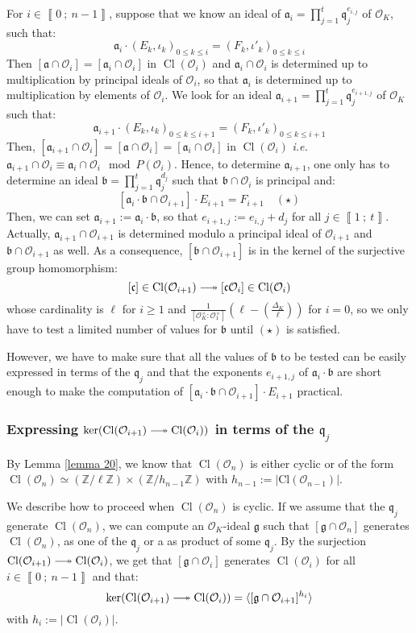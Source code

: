 \documentclass[a4paper,10pt]{report}
\theoremstyle{definition}
\theoremstyle{plain}
\theoremstyle{definition}
\newcommand{\ie}{\emph{i.e.}\ }
\newcommand{\Z}{\mathbb{Z}}
\newcommand{\mO}{\mathcal{O}}
\renewcommand{\i}[2]{\left\llbracket #1~;~#2\right\rrbracket}
\renewcommand{\(}{\left(}
\renewcommand{\)}{\right)}
\newcommand{\mf}[1]{\mathfrak{#1}}
\newcommand{\mfq}{\mathfrak{q}}
\DeclareMathOperator{\Cl}{Cl}
\begin{document}
For $i\in\i{0}{n-1}$, suppose that we know an ideal of $\mf{a}_i=\prod_{j=1}^t \mf{q}_j^{e_{i, j}}$ of $\mO_K$, such that: 
\[\mf{a}_i\cdot(E_k, \iota_k)_{0\leq k\leq i}=(F_k,\iota'_k)_{0\leq k\leq i}\]
Then $[\mf{a}\cap \mO_i]=[\mf{a}_i\cap\mO_i]$ in $\Cl(\mO_i)$ and $\mf{a}_i\cap \mO_i$ is determined up to multiplication by principal ideals of $\mO_i$, so that $\mf{a}_i$ is determined up to multiplication by elements of $\mO_i$.  We look for an ideal $\mf{a}_{i+1}=\prod_{j=1}^t \mf{q}_j^{e_{i+1, j}}$ of $\mO_K$ such that:
\[\mf{a}_{i+1}\cdot(E_k, \iota_k)_{0\leq k\leq i+1}=(F_k,\iota'_k)_{0\leq k\leq i+1}\]
Then, $[\mf{a}_{i+1}\cap\mO_{i}]=[\mf{a}\cap \mO_{i}]=[\mf{a}_i\cap\mO_{i}]$ in $\Cl(\mO_{i})$ \ie $\mf{a}_{i+1}\cap\mO_i\equiv \mf{a}_i\cap\mO_i \mod P(\mO_i)$. Hence, to determine $\mf{a}_{i+1}$, one only has to determine an ideal $\mf{b}=\prod_{j=1}^t\mf{q}_j^{d_j}$ such that $\mf{b}\cap\mO_i$ is principal and: 
\[[\mf{a}_i\cdot \mf{b}\cap\mO_{i+1}]\cdot E_{i+1}=F_{i+1} \quad (\star)\]
Then,  we can set $\mf{a}_{i+1}:=\mf{a}_i\cdot \mf{b}$, so that $e_{i+1,j}:=e_{i,j}+d_j$ for all $j\in\i{1}{t}$.  Actually, $\mf{a}_{i+1}\cap\mO_{i+1}$ is determined modulo a principal ideal of $\mO_{i+1}$ and $\mf{b}\cap\mO_{i+1}$ as well. As a consequence,  $[\mf{b}\cap\mO_{i+1}]$ is in the kernel of the surjective group homomorphism:
\[[\mf{c}]\in\Cl(\mO_{i+1})\relbar\joinrel\twoheadrightarrow [\mf{c}\mO_i]\in\Cl(\mO_{i})\]
whose cardinality is $\ell$ for $i\geq 1$ and $\frac{1}{[\mO_K^\times:\mO_1^\times]}\(\ell-\(\frac{\Delta_K}{\ell}\)\)$ for $i=0$, so we only have to test a limited number of values for $\mf{b}$ until $(\star)$ is satisfied.

However, we have to make sure that all the values of $\mf{b}$ to be tested can be easily expressed in terms of the $\mf{q}_j$ and that the exponents $e_{i+1,j}$ of $\mf{a}_i\cdot \mf{b}$ are short enough to make the computation of $[\mf{a}_i\cdot \mf{b}\cap\mO_{i+1}]\cdot E_{i+1}$ practical.  

\subsubsection{Expressing $\ker(\Cl(\mO_{i+1})\relbar\joinrel\twoheadrightarrow\Cl(\mO_{i}))$ in terms of the $\mfq_j$}

By Lemma \ref{lemma 20}, we know that $\Cl(\mO_n)$ is either cyclic or of the form $\Cl(\mO_n)\simeq(\Z/\ell\Z)\times(\Z/h_{n-1}\Z)$ with $h_{n-1}:=|\mbox{Cl}(\mO_{n-1})|$.

We describe how to proceed when $\Cl(\mO_n)$ is cyclic. If we assume that the $\mf{q}_j$ generate $\Cl(\mO_n)$, we can compute an $\mO_K$-ideal $\mf{g}$ such that $[\mf{g}\cap\mO_n]$ generates $\Cl(\mO_n)$, as one of the $\mf{q}_j$ or a as product of some $\mf{q}_j$. By the surjection $\Cl(\mO_{i+1})\relbar\joinrel\twoheadrightarrow\Cl(\mO_i)$, we get that $[\mf{g}\cap\mO_i]$ generates $\Cl(\mO_i)$ for all $i\in\i{0}{n-1}$ and that:
\[\ker(\Cl(\mO_{i+1})\relbar\joinrel\twoheadrightarrow\Cl(\mO_{i}))=\langle [\mf{g}\cap\mO_{i+1}]^{h_i}\rangle\]
with $h_i:=|\Cl(\mO_i)|$. 
\end{document}
